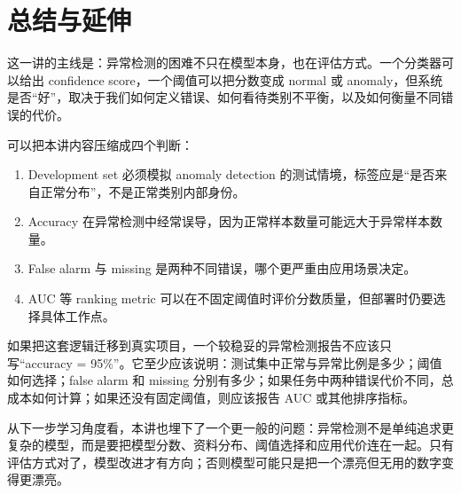 \documentclass[a4paper]{article}
\begin{document}
\section{总结与延伸}

这一讲的主线是：异常检测的困难不只在模型本身，也在评估方式。一个分类器可以给出 confidence score，一个阈值可以把分数变成 normal 或 anomaly，但系统是否“好”，取决于我们如何定义错误、如何看待类别不平衡，以及如何衡量不同错误的代价。

可以把本讲内容压缩成四个判断：
\begin{enumerate}
    \item Development set 必须模拟 anomaly detection 的测试情境，标签应是“是否来自正常分布”，不是正常类别内部身份。
    \item Accuracy 在异常检测中经常误导，因为正常样本数量可能远大于异常样本数量。
    \item False alarm 与 missing 是两种不同错误，哪个更严重由应用场景决定。
    \item AUC 等 ranking metric 可以在不固定阈值时评价分数质量，但部署时仍要选择具体工作点。
\end{enumerate}

如果把这套逻辑迁移到真实项目，一个较稳妥的异常检测报告不应该只写“accuracy = 95\%”。它至少应该说明：测试集中正常与异常比例是多少；阈值如何选择；false alarm 和 missing 分别有多少；如果任务中两种错误代价不同，总成本如何计算；如果还没有固定阈值，则应该报告 AUC 或其他排序指标。

从下一步学习角度看，本讲也埋下了一个更一般的问题：异常检测不是单纯追求更复杂的模型，而是要把模型分数、资料分布、阈值选择和应用代价连在一起。只有评估方式对了，模型改进才有方向；否则模型可能只是把一个漂亮但无用的数字变得更漂亮。
\end{document}
